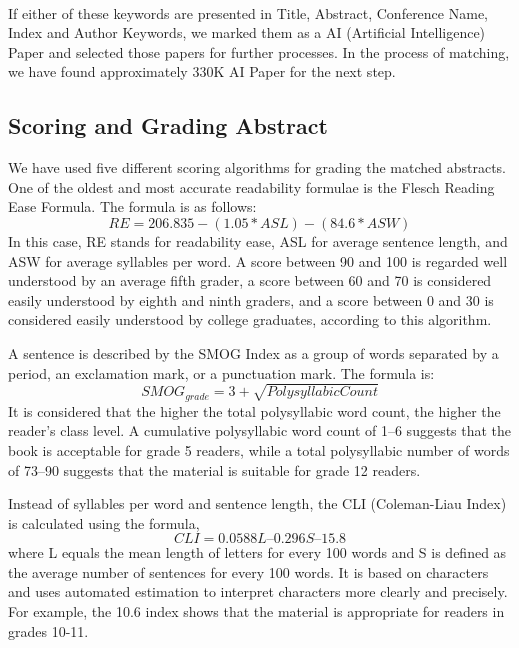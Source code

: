 \documentclass[conference]{IEEEtran}
\begin{document}
\begin{footnotesize}
\end{footnotesize}
\\
\par
If either of these keywords are presented in Title, Abstract, Conference Name, Index and Author Keywords, we marked them as a AI (Artificial Intelligence) Paper and selected those papers for further processes. In the process of matching, we have found approximately 330K AI Paper for the next step.

\subsection{Scoring and Grading Abstract}
We have used five different scoring algorithms for grading the matched abstracts. One of the oldest and most accurate readability formulae is the Flesch Reading Ease Formula. The formula is as follows: 
\begin{equation}
RE =206.835 - (1.05*ASL) - (84.6*ASW)\label{eq1}
\end{equation}
In this case, RE stands for readability ease, ASL for average sentence length, and ASW for average syllables per word. A score between 90 and 100 is regarded well understood by an average fifth grader, a score between 60 and 70 is considered easily understood by eighth and ninth graders, and a score between 0 and 30 is considered easily understood by college graduates, according to this algorithm\cite{b13}\cite{b14}.
\par
A sentence is described by the SMOG Index as a group of words separated by a period, an exclamation mark, or a punctuation mark. The formula is: 
\begin{equation}
SMOG_{grade}=3+\sqrt{PolysyllabicCount}\label{eq2}
\end{equation}
It is considered that the higher the total polysyllabic word count, the higher the reader's class level. A cumulative polysyllabic word count of 1–6 suggests that the book is acceptable for grade 5 readers, while a total polysyllabic number of words of 73–90 suggests that the material is suitable for grade 12 readers\cite{b13}\cite{b14}.
\par
Instead of syllables per word and sentence length, the CLI (Coleman-Liau Index) is calculated using the formula, 
\begin{equation}
CLI = 0.0588L – 0.296S – 15.8\label{eq3}
\end{equation}
where L equals the mean length of letters for every 100 words and S is defined as the average number of sentences for every 100 words. It is based on characters and uses automated estimation to interpret characters more clearly and precisely. For example, the 10.6 index shows that the material is appropriate for readers in grades 10-11\cite{b13}\cite{b14}.
\end{document}
